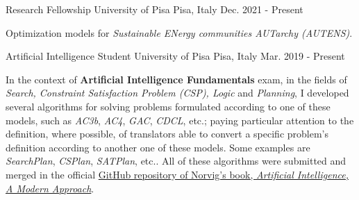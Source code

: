 

\begin{cventries}

  \cventry
    {Research Fellowship} %
    {University of Pisa} %
    {Pisa, Italy} %
    {Dec. 2021 - Present} %
    {   
      \begin{cvitems} %
        \item {Optimization models for \textit{Sustainable ENergy communities AUTarchy (AUTENS)}.}
      \end{cvitems}
    }

  \cventry
    {Artificial Intelligence Student} %
    {University of Pisa} %
    {Pisa, Italy} %
    {Mar. 2019 - Present} %
    {   
      \begin{cvitems} %
        \item {In the context of \textbf{Artificial Intelligence Fundamentals} exam, in the fields of \textit{Search, Constraint Satisfaction Problem (CSP), Logic} and \textit{Planning}, I developed several algorithms for solving problems formulated according to one of these models, such as \textit{AC3b}, \textit{AC4}, \textit{GAC}, \textit{CDCL}, etc.; paying particular attention to the definition, where possible, of translators able to convert a specific problem's definition according to another one of these models. Some examples are \textit{SearchPlan}, \textit{CSPlan}, \textit{SATPlan}, etc.. All of these algorithms were submitted and merged in the official \href{https://github.com/aimacode/aima-python}{GitHub repository of Norvig's book, \textit{Artificial Intelligence, A Modern Approach}}.}
      \end{cvitems}
    }


\end{cventries}
